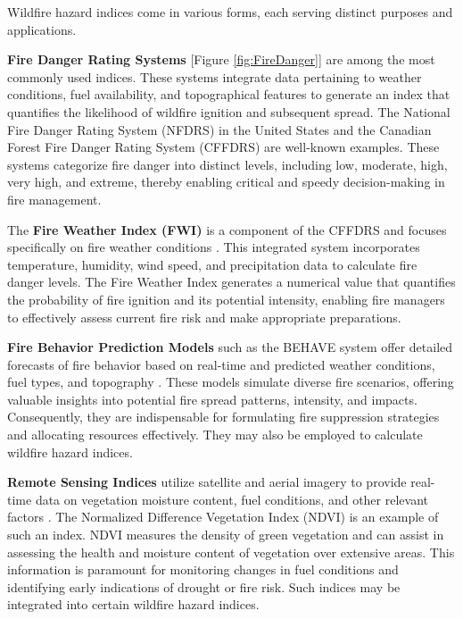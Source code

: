 \documentclass[
  12 pt,
]{Nemilov}
\begin{document}
Wildfire hazard indices come in various forms, each serving distinct purposes and applications.

\textbf{Fire Danger Rating Systems} {[}Figure \ref{fig:FireDanger}{]} are among the most commonly used indices. These systems integrate data pertaining to weather conditions, fuel availability, and topographical features to generate an index that quantifies the likelihood of wildfire ignition and subsequent spread. The National Fire Danger Rating System (NFDRS) \citep{deeming1972national} in the United States and the Canadian Forest Fire Danger Rating System (CFFDRS) \citep{stocks1989canadian, van1974structure} are well-known examples. These systems categorize fire danger into distinct levels, including low, moderate, high, very high, and extreme, thereby enabling critical and speedy decision-making in fire management.

The \textbf{Fire Weather Index (FWI)} is a component of the CFFDRS and focuses specifically on fire weather conditions \citep{van1974structure}. This integrated system incorporates temperature, humidity, wind speed, and precipitation data to calculate fire danger levels. The Fire Weather Index generates a numerical value that quantifies the probability of fire ignition and its potential intensity, enabling fire managers to effectively assess current fire risk and make appropriate preparations.

\textbf{Fire Behavior Prediction Models} such as the BEHAVE system offer detailed forecasts of fire behavior based on real-time and predicted weather conditions, fuel types, and topography \citep{burgan1984behave}. These models simulate diverse fire scenarios, offering valuable insights into potential fire spread patterns, intensity, and impacts. Consequently, they are indispensable for formulating fire suppression strategies and allocating resources effectively. They may also be employed to calculate wildfire hazard indices.

\textbf{Remote Sensing Indices} utilize satellite and aerial imagery to provide real-time data on vegetation moisture content, fuel conditions, and other relevant factors \citep{leblon2001forest}. The Normalized Difference Vegetation Index (NDVI) \citep{rouse1974monitoring} is an example of such an index. NDVI measures the density of green vegetation and can assist in assessing the health and moisture content of vegetation over extensive areas. This information is paramount for monitoring changes in fuel conditions and identifying early indications of drought or fire risk. Such indices may be integrated into certain wildfire hazard indices.
\end{document}
